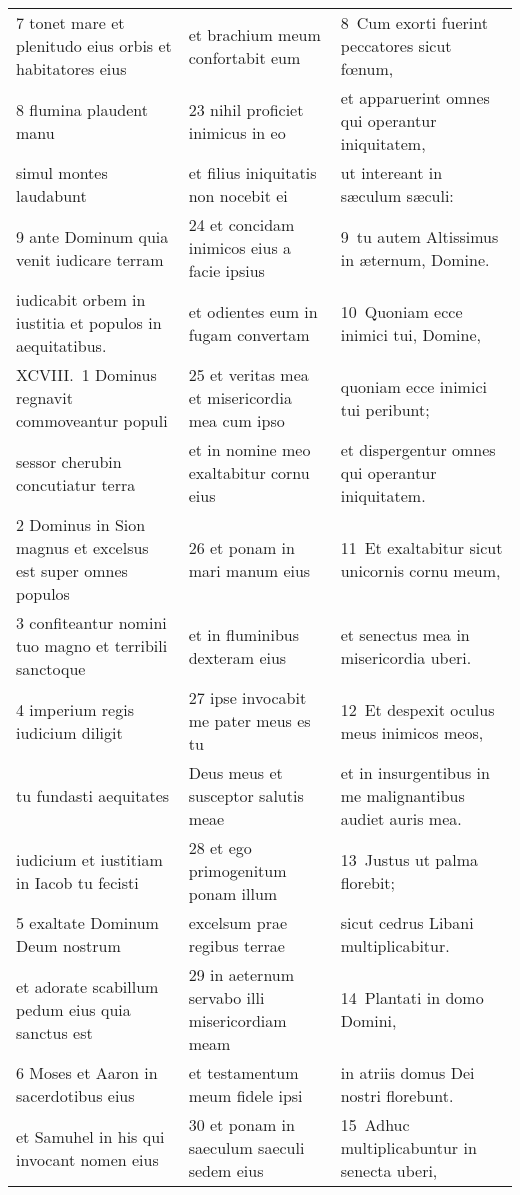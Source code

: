 \documentclass{article}
\begin{document}
\begin{longtable}{@{}p{}p{}p{}@{}}
7 tonet mare et plenitudo eius orbis et habitatores eius	&	et brachium meum confortabit eum	&	8 Cum exorti fuerint peccatores sicut fœnum,	\\
8 flumina plaudent manu	&	23 nihil proficiet inimicus in eo	&	et apparuerint omnes qui operantur iniquitatem,	\\
simul montes laudabunt	&	et filius iniquitatis non nocebit ei	&	ut intereant in sæculum sæculi:	\\
9 ante Dominum quia venit iudicare terram	&	24 et concidam inimicos eius a facie ipsius	&	9 tu autem Altissimus in æternum, Domine.	\\
iudicabit orbem in iustitia et populos in aequitatibus.	&	et odientes eum in fugam convertam	&	10 Quoniam ecce inimici tui, Domine,	\\
XCVIII. 1 Dominus regnavit commoveantur populi	&	25 et veritas mea et misericordia mea cum ipso	&	quoniam ecce inimici tui peribunt;	\\
sessor cherubin concutiatur terra	&	et in nomine meo exaltabitur cornu eius	&	et dispergentur omnes qui operantur iniquitatem.	\\
2 Dominus in Sion magnus et excelsus est super omnes populos	&	26 et ponam in mari manum eius	&	11 Et exaltabitur sicut unicornis cornu meum,	\\
3 confiteantur nomini tuo magno et terribili sanctoque	&	et in fluminibus dexteram eius	&	et senectus mea in misericordia uberi.	\\
4 imperium regis iudicium diligit	&	27 ipse invocabit me pater meus es tu	&	12 Et despexit oculus meus inimicos meos,	\\
tu fundasti aequitates	&	Deus meus et susceptor salutis meae	&	et in insurgentibus in me malignantibus audiet auris mea.	\\
iudicium et iustitiam in Iacob tu fecisti	&	28 et ego primogenitum ponam illum	&	13 Justus ut palma florebit;	\\
5 exaltate Dominum Deum nostrum	&	excelsum prae regibus terrae	&	sicut cedrus Libani multiplicabitur.	\\
et adorate scabillum pedum eius quia sanctus est	&	29 in aeternum servabo illi misericordiam meam	&	14 Plantati in domo Domini,	\\
6 Moses et Aaron in sacerdotibus eius	&	et testamentum meum fidele ipsi	&	in atriis domus Dei nostri florebunt.	\\
et Samuhel in his qui invocant nomen eius	&	30 et ponam in saeculum saeculi sedem eius	&	15 Adhuc multiplicabuntur in senecta uberi,	\\

\end{longtable}
\end{document}
